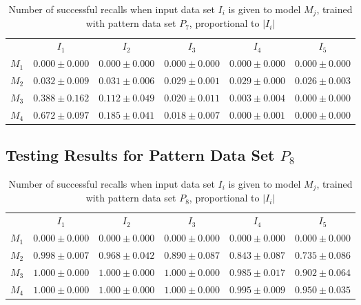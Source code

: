 \documentclass[anon]{CI}
\begin{document}
		\begin{table}[H]
			\centering
			\def\arraystretch{1.5}
			\footnotesize
			\begin{tabular}{cccccc}
				
				& $I_{1}$  & $I_{2}$  & $I_{3}$  & $I_{4}$  & $I_{5}$ \\ \cline{2-6}
				$M_{1}$  & $0.000\pm0.000$  & $0.000\pm0.000$  & $0.000\pm0.000$  & $0.000\pm0.000$  & $0.000\pm0.000$ \\
				$M_{2}$  & $0.032\pm0.009$  & $0.031\pm0.006$  & $0.029\pm0.001$  & $0.029\pm0.000$  & $0.026\pm0.003$ \\
				$M_{3}$  & $0.388\pm0.162$  & $0.112\pm0.049$  & $0.020\pm0.011$  & $0.003\pm0.004$  & $0.000\pm0.000$ \\
				$M_{4}$  & $0.672\pm0.097$  & $0.185\pm0.041$  & $0.018\pm0.007$  & $0.000\pm0.001$  & $0.000\pm0.000$ \\
				
			\end{tabular}
			\caption{Number of successful recalls when input data set $I_i$ is given to model $M_j$, trained with pattern data set $P_{7}$, proportional to $\left|I_i\right|$}
		\end{table}
		
		\subsection{Testing Results for Pattern Data Set $P_{8}$}
		
		
		\begin{table}[H]
			\centering
			\def\arraystretch{1.5}
			\footnotesize
			\begin{tabular}{cccccc}
				
				& $I_{1}$  & $I_{2}$  & $I_{3}$  & $I_{4}$  & $I_{5}$ \\ \cline{2-6}
				$M_{1}$  & $0.000\pm0.000$  & $0.000\pm0.000$  & $0.000\pm0.000$  & $0.000\pm0.000$  & $0.000\pm0.000$ \\
				$M_{2}$  & $0.998\pm0.007$  & $0.968\pm0.042$  & $0.890\pm0.087$  & $0.843\pm0.087$  & $0.735\pm0.086$ \\
				$M_{3}$  & $1.000\pm0.000$  & $1.000\pm0.000$  & $1.000\pm0.000$  & $0.985\pm0.017$  & $0.902\pm0.064$ \\
				$M_{4}$  & $1.000\pm0.000$  & $1.000\pm0.000$  & $1.000\pm0.000$  & $0.995\pm0.009$  & $0.950\pm0.035$ \\
				
			\end{tabular}
			\caption{Number of successful recalls when input data set $I_i$ is given to model $M_j$, trained with pattern data set $P_{8}$, proportional to $\left|I_i\right|$}
		\end{table}
		
\end{document}
